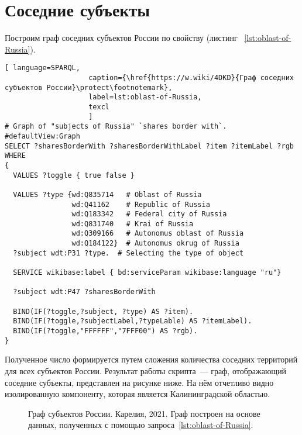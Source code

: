 \section{Соседние субъекты}

Построим граф соседних субъектов России по свойству  (листинг ~\protect\ref{lst:oblast-of-Russia}).

\begin{lstlisting}[ language=SPARQL, 
                    caption={\href{https://w.wiki/4DKD}{Граф соседних субъектов России}\protect\footnotemark},
                    label=lst:oblast-of-Russia,
                    texcl 
                    ]
# Graph of "subjects of Russia" `shares border with`. 
#defaultView:Graph
SELECT ?sharesBorderWith ?sharesBorderWithLabel ?item ?itemLabel ?rgb
WHERE
{
  VALUES ?toggle { true false }
  
  VALUES ?type {wd:Q835714   # Oblast of Russia
                wd:Q41162    # Republic of Russia
                wd:Q183342   # Federal city of Russia
                wd:Q831740   # Krai of Russia
                wd:Q309166   # Autonomus oblast of Russia
                wd:Q184122}  # Autonomus okrug of Russia
  ?subject wdt:P31 ?type.  # Selecting the type of object  
  
  SERVICE wikibase:label { bd:serviceParam wikibase:language "ru"}
  
  ?subject wdt:P47 ?sharesBorderWith   
           
  BIND(IF(?toggle,?subject, ?type) AS ?item).
  BIND(IF(?toggle,?subjectLabel,?typeLable) AS ?itemLabel).
  BIND(IF(?toggle,"FFFFFF","7FFF00") AS ?rgb).
}
\end{lstlisting}%

Полученное число формируется путем сложения количества соседних территорий для всех субъектов России. Результат работы скрипта~--- граф, отображающий соседние субъекты, представлен на рисунке ниже. На нём отчетливо видно изолированную компоненту, которая является Калининградской областью.

\begin{figure*}[h]

    \setlength{\fboxsep}{0pt}%
    \setlength{\fboxrule}{1pt}%
	\caption[Граф субъектов России. Карелия, 2021.]{Граф субъектов России. Карелия, 2021. Граф построен на основе данных, полученных с помощью запроса~\protect\ref{lst:oblast-of-Russia}.}%
\end{figure*} 

